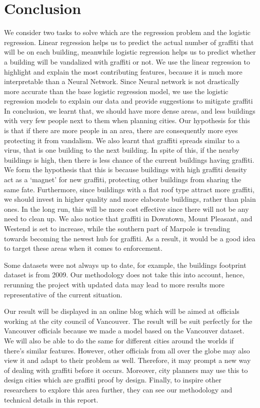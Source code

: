 \chapter{Conclusion}

We consider two tasks to solve which are the regression problem and the logistic regression. Linear regression helps us to predict the actual number of graffiti that will be on each building, meanwhile logistic regression helps us to predict whether a building will be vandalized with graffiti or not. We use the linear regression to highlight and explain the most contributing features, because it is much more interpretable than a Neural Network. Since Neural network is not drastically more accurate than the base logistic regression model, we use the logistic regression models to explain our data and provide suggestions to mitigate graffiti
In conclusion, we learnt that, we should have more dense areas, and less buildings with very few people next to them when planning cities. Our hypothesis for this is that if there are more people in an area, there are consequently more eyes protecting it from vandalism. We also learnt that graffiti spreads similar to a virus, that is one building to the next building. In spite of this, if the nearby buildings is high, then there is less chance of the current buildings having graffiti. We form the hypothesis that this is because buildings with high graffiti density act as a ‘magnet’ for new graffiti, protecting other buildings from sharing the same fate. Furthermore, since buildings with a flat roof type attract more graffiti, we should invest in higher quality and more elaborate buildings, rather than plain ones. In the long run, this will be more cost effective since there will not be any need to clean up. We also notice that graffiti in Downtown, Mount Pleasant, and Westend is set to increase, while the southern part of Marpole is trending towards becoming  the newest hub for graffiti. As a result, it would be a good idea to target these areas when it comes to enforcement.

Some datasets were not always up to date, for example, the buildings footprint dataset is from 2009. Our methodology does not take this into account, hence, rerunning the project with updated data may lead to more results more representative of the current situation.

Our result will be displayed in an online blog which will be aimed at officials working at the city council of Vancouver. The result will be suit perfectly for the Vancouver officials because we made a model based on the Vancouver dataset. We will also be able to do the same for different cities around the worlds if there’s similar features. However, other officials from all over the globe may also view it and adapt to their problem as well. Therefore, it may prompt a new way of dealing with graffiti before it occurs. Moreover, city planners may use this to design cities which are graffiti proof by design. Finally, to inspire other researchers to explore this area further, they can see our methodology and technical details in this report.